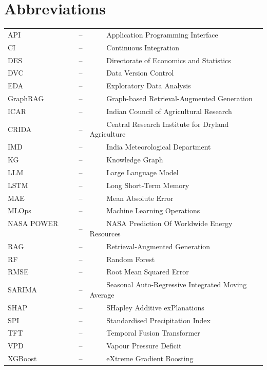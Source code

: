 \documentclass[a4paper, 12pt]{report}
\renewcommand{\_}{\textunderscore\allowbreak}
\theoremstyle{definition}
\begin{document}
\section*{{\huge Abbreviations}\hfill} 
\vspace{1.2cm}
\begin{tabular}{lll}
API ~~~~&--&~~~~ Application Programming Interface\\
CI ~~~~&--&~~~~ Continuous Integration\\
DES ~~~~&--&~~~~ Directorate of Economics and Statistics\\
DVC ~~~~&--&~~~~ Data Version Control\\
EDA ~~~~&--&~~~~ Exploratory Data Analysis\\
GraphRAG ~~~~&--&~~~~ Graph-based Retrieval-Augmented Generation\\
ICAR ~~~~&--&~~~~ Indian Council of Agricultural Research\\
CRIDA ~~~~&--&~~~~ Central Research Institute for Dryland Agriculture\\
IMD ~~~~&--&~~~~ India Meteorological Department\\
KG ~~~~&--&~~~~ Knowledge Graph\\
LLM ~~~~&--&~~~~ Large Language Model\\
LSTM ~~~~&--&~~~~ Long Short-Term Memory\\
MAE ~~~~&--&~~~~ Mean Absolute Error\\
MLOps ~~~~&--&~~~~ Machine Learning Operations\\
NASA POWER ~~~~&--&~~~~ NASA Prediction Of Worldwide Energy Resources\\
RAG ~~~~&--&~~~~ Retrieval-Augmented Generation\\
RF ~~~~&--&~~~~ Random Forest\\
RMSE ~~~~&--&~~~~ Root Mean Squared Error\\
SARIMA ~~~~&--&~~~~ Seasonal Auto-Regressive Integrated Moving Average\\
SHAP ~~~~&--&~~~~ SHapley Additive exPlanations\\
SPI ~~~~&--&~~~~ Standardised Precipitation Index\\
TFT ~~~~&--&~~~~ Temporal Fusion Transformer\\
VPD ~~~~&--&~~~~ Vapour Pressure Deficit\\
XGBoost ~~~~&--&~~~~ eXtreme Gradient Boosting\\
\end{tabular}
\newpage
\end{document}
